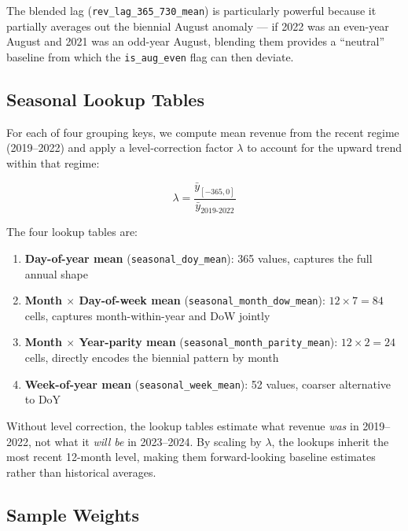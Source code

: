 \documentclass{article}
\begin{document}
The blended lag (\texttt{rev\_lag\_365\_730\_mean}) is particularly powerful
because it partially averages out the biennial August anomaly — if 2022 was an
even-year August and 2021 was an odd-year August, blending them provides a
``neutral'' baseline from which the \texttt{is\_aug\_even} flag can then deviate.

\subsection{Seasonal Lookup Tables}

For each of four grouping keys, we compute mean revenue from the recent regime
(2019--2022) and apply a level-correction factor $\lambda$ to account for the
upward trend within that regime:

\begin{equation}
  \lambda = \frac{\bar{y}_{[-365,0]}}{\bar{y}_{\text{2019-2022}}}
\end{equation}

The four lookup tables are:

\begin{enumerate}[leftmargin=1.5em, itemsep=2pt]
  \item \textbf{Day-of-year mean} (\texttt{seasonal\_doy\_mean}): 365 values,
    captures the full annual shape
  \item \textbf{Month $\times$ Day-of-week mean} (\texttt{seasonal\_month\_dow\_mean}):
    $12 \times 7 = 84$ cells, captures month-within-year and DoW jointly
  \item \textbf{Month $\times$ Year-parity mean} (\texttt{seasonal\_month\_parity\_mean}):
    $12 \times 2 = 24$ cells, directly encodes the biennial pattern by month
  \item \textbf{Week-of-year mean} (\texttt{seasonal\_week\_mean}): 52 values,
    coarser alternative to DoY
\end{enumerate}

\begin{insightbox}
Without level correction, the lookup tables estimate what revenue
\emph{was} in 2019--2022, not what it \emph{will be} in 2023--2024.
By scaling by $\lambda$, the lookups inherit the most recent 12-month level,
making them forward-looking baseline estimates rather than historical averages.
\end{insightbox}

\subsection{Sample Weights}
\end{document}
